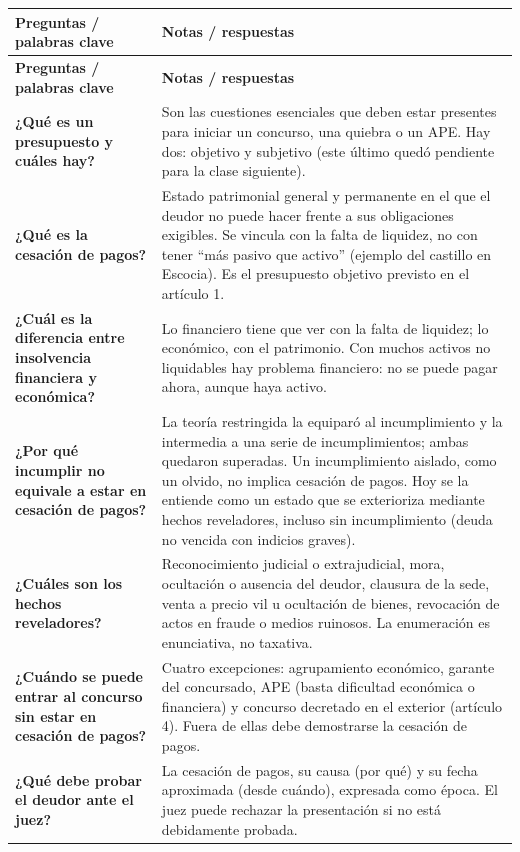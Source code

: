 \documentclass[12pt,oneside]{book}
\newcommand{\cornellrow}[2]{\textbf{#1} & #2 \\ \midrule}
\begin{document}
{\RaggedRight
\begin{longtable}{
    >{\RaggedRight\arraybackslash}p{}
    >{\RaggedRight\arraybackslash}p{}
}
\toprule
\textbf{Preguntas / palabras clave} & \textbf{Notas / respuestas} \\
\midrule
\endfirsthead
\toprule
\textbf{Preguntas / palabras clave} & \textbf{Notas / respuestas} \\
\midrule
\endhead

\cornellrow{¿Qué es un presupuesto y cuáles hay?}{Son las cuestiones esenciales que deben estar presentes para iniciar un concurso, una quiebra o un APE. Hay dos: objetivo y subjetivo (este último quedó pendiente para la clase siguiente).}

\cornellrow{¿Qué es la cesación de pagos?}{Estado patrimonial general y permanente en el que el deudor no puede hacer frente a sus obligaciones exigibles. Se vincula con la falta de liquidez, no con tener ``más pasivo que activo'' (ejemplo del castillo en Escocia). Es el presupuesto objetivo previsto en el artículo 1.}

\cornellrow{¿Cuál es la diferencia entre insolvencia financiera y económica?}{Lo financiero tiene que ver con la falta de liquidez; lo económico, con el patrimonio. Con muchos activos no liquidables hay problema financiero: no se puede pagar ahora, aunque haya activo.}

\cornellrow{¿Por qué incumplir no equivale a estar en cesación de pagos?}{La teoría restringida la equiparó al incumplimiento y la intermedia a una serie de incumplimientos; ambas quedaron superadas. Un incumplimiento aislado, como un olvido, no implica cesación de pagos. Hoy se la entiende como un estado que se exterioriza mediante hechos reveladores, incluso sin incumplimiento (deuda no vencida con indicios graves).}

\cornellrow{¿Cuáles son los hechos reveladores?}{Reconocimiento judicial o extrajudicial, mora, ocultación o ausencia del deudor, clausura de la sede, venta a precio vil u ocultación de bienes, revocación de actos en fraude o medios ruinosos. La enumeración es enunciativa, no taxativa.}

\cornellrow{¿Cuándo se puede entrar al concurso sin estar en cesación de pagos?}{Cuatro excepciones: agrupamiento económico, garante del concursado, APE (basta dificultad económica o financiera) y concurso decretado en el exterior (artículo 4). Fuera de ellas debe demostrarse la cesación de pagos.}

\cornellrow{¿Qué debe probar el deudor ante el juez?}{La cesación de pagos, su causa (por qué) y su fecha aproximada (desde cuándo), expresada como época. El juez puede rechazar la presentación si no está debidamente probada.}


\end{longtable}}
\end{document}
